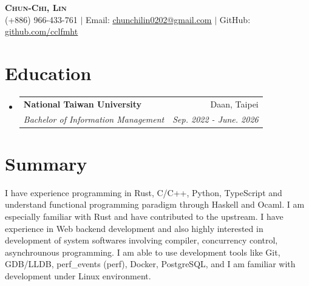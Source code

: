 \documentclass[letterpaper,11pt]{article}
\makeatletter
\newcommand{\resumeItem}[1]{
  \item\small{
    {#1 \vspace{-2pt}}
  }
}
\newcommand{\resumeSubheading}[4]{
  \vspace{-2pt}\item
    \begin{tabular*}{0.97\textwidth}[t]{l@{\extracolsep{\fill}}r}
      \textbf{#1} & #2 \\
      \textit{\small#3} & \textit{\small #4} \\
    \end{tabular*}\vspace{-7pt}
}
\newcommand{\resumeSubHeadingListStart}{\begin{itemize}[leftmargin=0.15in, label={}]}
\newcommand{\resumeSubHeadingListEnd}{\end{itemize}}
\newcommand{\resumeItemListStart}{\begin{itemize}}
\newcommand{\resumeItemListEnd}{\end{itemize}\vspace{-5pt}}
\makeatother
\begin{document}

\begin{center}
	\textbf{\Huge \scshape Chun-Chi, Lin} \\ \vspace{1pt}
	\small (+886) 966-433-761 $|$ Email: \href{mailto:chunchilin0202@gmail.com}{\underline{chunchilin0202@gmail.com}} $|$
	GitHub: \href{https://github.com/cclfmht}{\underline{github.com/cclfmht}}
\end{center}


\section{Education}
\resumeSubHeadingListStart
\resumeSubheading
{National Taiwan University}{Daan, Taipei}
{Bachelor of Information Management}{Sep. 2022 - June. 2026}
\resumeSubHeadingListEnd

\section{Summary}
I have experience programming in Rust, C/C++, Python, TypeScript and understand functional programming
paradigm through Haskell and Ocaml. I am especially familiar with Rust and have contributed to
the upstream. I have experience in Web backend development and also highly interested in development of
system softwares involving compiler, concurrency control, asynchrounous programming. I am able to
use development tools like Git, GDB/LLDB, perf\_events (perf), Docker, PostgreSQL, and I am familiar
with development under Linux environment.


\end{document}

